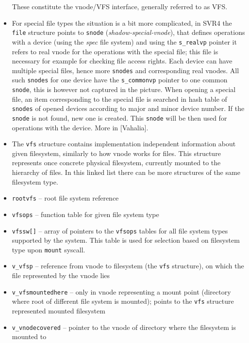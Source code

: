 \begin{itemize}
These  constitute the vnode/VFS interface, generally
referred to as VFS.
\item For special file types the situation is a bit more complicated, in SVR4
the \texttt{file} structure points to \texttt{snode}
(\emph{shadow-special-vnode}), that defines operations with a device (using the
\emph{spec} file system) and using the \texttt{s\_realvp} pointer it refers to
real vnode for the operations with the special file; this file is necessary for
example for checking file access rights. Each device can have multiple special
files, hence more \texttt{snodes} and corresponding real vnodes. All such
\texttt{snodes} for one device have the \texttt{s\_commonvp} pointer to one
common \texttt{snode}, this is however not captured in the picture. When opening
a special file, an item corresponding to the special file is searched in hash
table of \texttt{snodes} of opened devices according to major and minor device
number. If the \texttt{snode} is not found, new one is created. This
\texttt{snode} will be then used for operations with the device. More in
[Vahalia].
\end{itemize}



\begin{slide}
\begin{center}

\end{center}
\end{slide}

\begin{itemize}
\item The \texttt{vfs} structure contains implementation independent
information about given filesystem, similarly to how vnode works for files.
This structure represents once concrete physical filesystem, currently mounted
to the hierarchy of files. In this linked list there can be more structures of
the same filesystem type.
\item \texttt{rootvfs} -- root file system reference
\item \texttt{vfsops} -- function table for given file system type
\item \texttt{vfssw[]} -- array of pointers to the \texttt{vfsops} tables for
all file system types supported by the system. This table is used for selection
based on filesystem type upon \texttt{mount} syscall.
\item \texttt{v\_vfsp} -- reference from vnode to filesystem (the \texttt{vfs}
structure), on which the file represented by the vnode lies
\item \texttt{v\_vfsmountedhere} -- only in vnode representing a mount point
(directory where root of different file system is mounted); points to
the \texttt{vfs} structure represented mounted filesystem
\item \texttt{v\_vnodecovered} -- pointer to the vnode of directory where
the filesystem is mounted to
\end{itemize}

